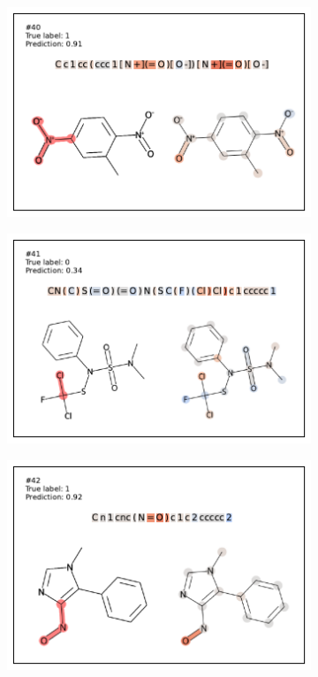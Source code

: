 \begin{figure}
\begin{subfigure}[b]{0.33\textwidth}
\end{subfigure}\begin{subfigure}[b]{0.33\textwidth} 
  \centering 
  \includegraphics[width=\textwidth]{figures/ames/ames40.pdf} 
\end{subfigure} 
\begin{subfigure}[b]{0.33\textwidth} 
  \centering 
  \includegraphics[width=\textwidth]{figures/ames/ames41.pdf} 
\end{subfigure}\begin{subfigure}[b]{0.33\textwidth} 
  \centering 
  \includegraphics[width=\textwidth]{figures/ames/ames42.pdf} 

\end{subfigure}
\end{figure}
